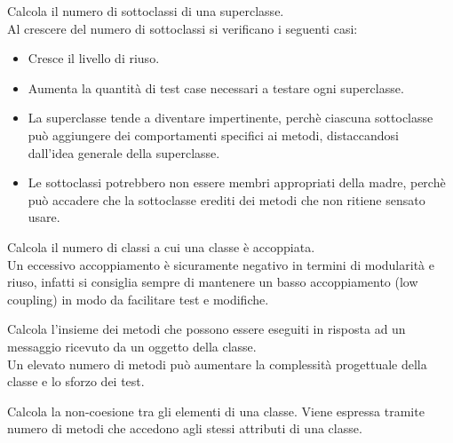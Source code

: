 {    
    Calcola il numero di sottoclassi di una superclasse.\\
    Al crescere del numero di sottoclassi si verificano i seguenti casi:
    \begin{itemize}
        \item Cresce il livello di riuso.
        \item Aumenta la quantità di test case necessari a testare ogni superclasse.
        \item La superclasse tende a diventare impertinente, perchè ciascuna sottoclasse può 
        aggiungere dei comportamenti specifici ai metodi, distaccandosi \\dall'idea generale della superclasse. 
        \item Le sottoclassi potrebbero non essere membri appropriati della madre, perchè può accadere che la sottoclasse
        erediti dei metodi che non ritiene sensato usare.
    \end{itemize}

    Calcola il numero di classi a cui una classe è accoppiata.\\
    Un eccessivo accoppiamento è sicuramente negativo in termini di modularità e riuso, infatti si consiglia sempre
    di mantenere un basso accoppiamento (low coupling) in modo da facilitare test e modifiche.

    Calcola l'insieme dei metodi che possono essere eseguiti in risposta ad un messaggio ricevuto da un oggetto della classe.\\
    Un elevato numero di metodi può aumentare la complessità progettuale della classe e lo sforzo dei test.

    Calcola la non-coesione tra gli elementi di una classe. Viene espressa tramite numero di metodi che accedono agli 
    stessi attributi di una classe.
    
}

